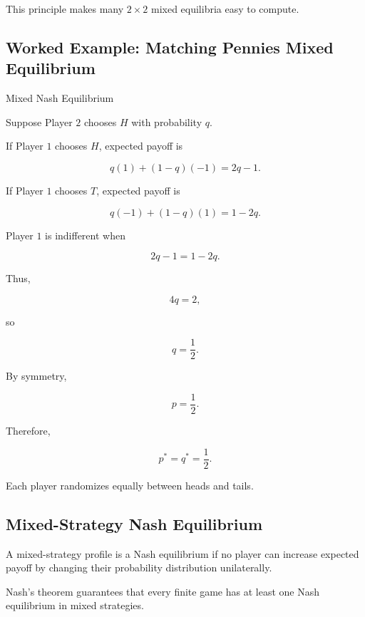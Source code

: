 This principle makes many \(2\times2\) mixed equilibria easy to compute.

\subsection{Worked Example: Matching Pennies Mixed Equilibrium}
\label{subsec:worked-matching-pennies}

\begin{workedexamplebox}{Mixed Nash Equilibrium}

Suppose Player \(2\) chooses \(H\) with probability \(q\).

If Player \(1\) chooses \(H\), expected payoff is

\[
q(1)+(1-q)(-1)
=
2q-1.
\]

If Player \(1\) chooses \(T\), expected payoff is

\[
q(-1)+(1-q)(1)
=
1-2q.
\]

Player \(1\) is indifferent when

\[
2q-1
=
1-2q.
\]

Thus,

\[
4q=2,
\]

so

\[
q=\frac12.
\]

By symmetry,

\[
p=\frac12.
\]

Therefore,

\begin{answerbox}
\[
\boxed{
p^*
=
q^*
=
\frac12.
}
\]
\end{answerbox}

Each player randomizes equally between heads and tails.

\end{workedexamplebox}

\subsection{Mixed-Strategy Nash Equilibrium}
\label{subsec:mixed-nash-equilibrium}

A mixed-strategy profile is a Nash equilibrium if no player can increase
expected payoff by changing their probability distribution unilaterally.

Nash's theorem guarantees that every finite game has at least one Nash
equilibrium in mixed strategies.

